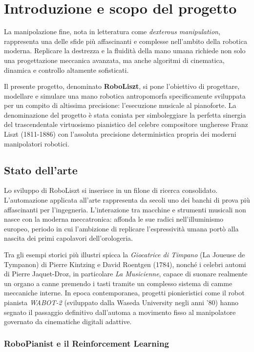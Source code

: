 
\chapter{Introduzione e scopo del progetto}

La manipolazione fine, nota in letteratura come \textit{dexterous manipulation}, rappresenta una delle sfide più affascinanti e complesse nell'ambito della robotica moderna. 
Replicare la destrezza e la fluidità della mano umana richiede non solo una progettazione meccanica avanzata, ma anche algoritmi di cinematica, dinamica e controllo altamente sofisticati. 

Il presente progetto, denominato \textbf{RoboLiszt}, si pone l'obiettivo di progettare, modellare e simulare una mano robotica antropomorfa specificamente sviluppata per un compito di altissima precisione: l'esecuzione musicale al pianoforte.
La denominazione del progetto è stata coniata per simboleggiare la perfetta sinergia del trascendentale virtuosismo pianistico del celebre compositore ungherese Franz Liszt (1811-1886) con l'assoluta precisione deterministica propria dei moderni manipolatori robotici. 

\section{Stato dell'arte}

Lo sviluppo di RoboLiszt si inserisce in un filone di ricerca consolidato.
L'automazione applicata all'arte rappresenta da secoli uno dei banchi di prova più affascinanti per l'ingegneria.
L’interazione tra macchine e strumenti musicali non nasce con la moderna meccatronica: affonda le sue radici nell’illuminismo europeo, periodo in cui l’ambizione di replicare l’espressività umana portò alla nascita dei primi capolavori dell'orologeria.

Tra gli esempi storici più illustri spicca la \textit{Giocatrice di Timpano} (La Joueuse de Tympanon) di Pierre Kintzing e David Roentgen (1784), nonché i celebri automi di Pierre Jaquet-Droz, in particolare \textit{La Musicienne}, capace di suonare realmente un organo a canne premendo i tasti tramite un complesso sistema di camme meccaniche interne. 
In epoca contemporanea, progetti pionieristici come il robot pianista \textit{WABOT-2} (sviluppato dalla Waseda University negli anni '80) hanno segnato il passaggio definitivo dall'automa a movimento fisso al manipolatore governato da cinematiche digitali adattive.

\subsection{RoboPianist e il Reinforcement Learning}

